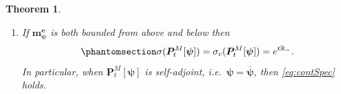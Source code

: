 \documentclass[12pt]{amsart}
\newcommand{\hlabel}{\phantomsection\label}
\numberwithin{equation}{section}
\newcommand{\bb}{\mathbb}
\newcommand{\ov}{\overline}
\newcommand{\bmrm}[2][2]{\mathbf{#2}^{#1}}
\newcommand{\mm}{\mathbf{m}}
\newcommand{\f}{\mathbf{f}}
\renewcommand{\tau}{\uptau}
\newtheorem{thm}{Theorem}[section]
\theoremstyle{definition}
\theoremstyle{assump}
\theoremstyle{remark}
\begin{document}
\begin{thm}
\begin{enumerate}
\begin{equation*}
    e^{t\bb{R}_-}\subseteq\sigma_r(\bm{P}^M_t[\bm{\psi}]) \mbox{ and } \sigma_p(\bm{P}^M_t[\bm{\psi}])=\emptyset
     \end{equation*}
     with,  for any $\bm{q}\in\bb{R}_+^d$, $t>0$ and $\f\in\bmrm{L}(\bb{R}^d,{\mathbf{e}}_M)$,
     \begin{equation*}
     \left\langle \bm{P}^M_t[\bm{\psi}] \f,\tau_{\ln \bm{q}}\mathbf{J}^M_{\ov{\bm{\psi}}}\right\rangle_{\bmrm{L}(\bb{R}^d,{\mathbf{e}}_M)}   = \mathbf{e}(-t\bm{q}) \left\langle \f,\tau_{\ln \bm{q}}\mathbf{J}^M_{\ov{\bm{\psi}}}\right\rangle_{\bmrm{L}(\bb{R}^d,{\mathbf{e}}_M)}.
     \end{equation*}
\item \hlabel{it:cont_spect} If $\mm^{\mathbf e}_{\bm\psi}$ is both bounded from above and below then \begin{equation} \hlabel{eq:contSpec}
    \sigma(\bm{P}^M_t[\bm{\psi}])=\sigma_c(\bm{P}^M_t[\bm{\psi}])=e^{t\bb{R}_-}.
     \end{equation}
     In particular, when $\bm{P}^M_t[\bm{\psi}]$ is self-adjoint, i.e.~$\bm{\psi}=\ov{\bm{\psi}}$, then \eqref{eq:contSpec} holds. %
\end{enumerate}
\end{thm}
\end{document}
